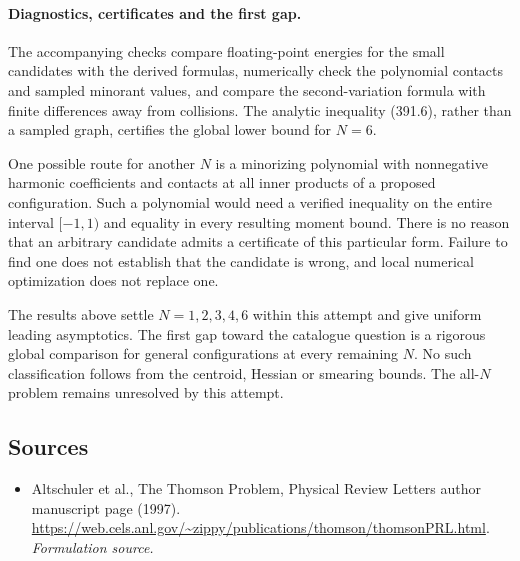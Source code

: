 \documentclass[11pt]{article}
\begin{document}
\paragraph{Diagnostics, certificates and the first gap.}
The accompanying checks compare floating-point energies for the small
candidates with the derived formulas, numerically check the polynomial
contacts and sampled minorant values, and compare the second-variation
formula with finite differences away from collisions. The analytic inequality
(391.6), rather than a sampled graph, certifies the global lower
bound for $N=6$.

One possible route for another $N$ is a minorizing polynomial with
nonnegative harmonic coefficients and contacts at all inner products
of a proposed configuration. Such a polynomial would need a verified
inequality on the entire interval $[-1,1)$ and equality in every
resulting moment bound. There is no reason that an arbitrary candidate
admits a certificate of this particular form. Failure to find one
does not establish that the candidate is wrong, and local numerical
optimization does not replace one.

The results above settle $N=1,2,3,4,6$ within this attempt and give
uniform leading asymptotics. The first gap toward the catalogue
question is a rigorous global comparison for general configurations
at every remaining $N$. No such classification follows from the
centroid, Hessian or smearing bounds. The all-$N$ problem remains
unresolved by this attempt.
\subsection{Sources}
\begin{itemize}
\item[S1]Altschuler et al., The Thomson Problem, Physical Review Letters author manuscript page (1997).
\url{https://web.cels.anl.gov/~zippy/publications/thomson/thomsonPRL.html}.
\textit{Formulation source.}
\end{itemize}
\end{document}
